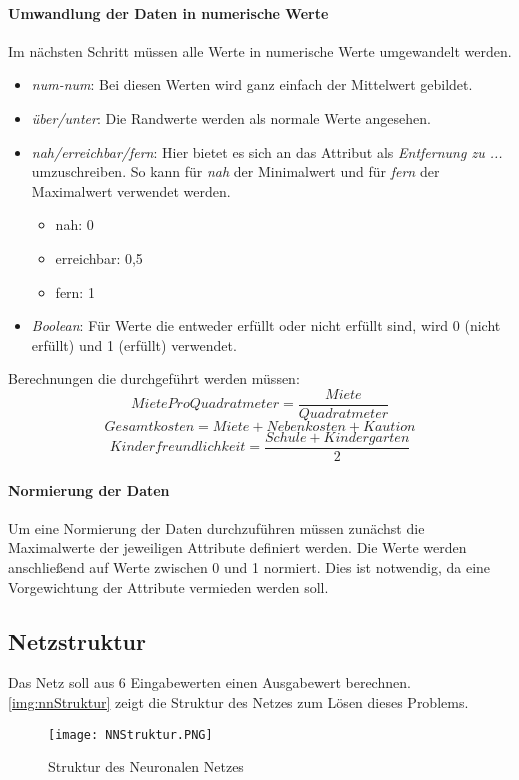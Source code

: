 \paragraph{Umwandlung der Daten in numerische Werte}
Im nächsten Schritt müssen alle Werte in numerische Werte umgewandelt werden. 
\begin{itemize}
    \item \textit{num-num}: Bei diesen Werten wird ganz einfach der Mittelwert gebildet. 
    \item \textit{über/unter}: Die Randwerte werden als normale Werte angesehen. 
    \item \textit{nah/erreichbar/fern}: Hier bietet es sich an das Attribut als \textit{Entfernung zu ...} umzuschreiben. 
                So kann für \textit{nah} der Minimalwert und für \textit{fern} der Maximalwert verwendet werden.
    \begin{itemize}
        \item nah: 0
        \item erreichbar: 0,5
        \item fern: 1
    \end{itemize}
    \item \textit{Boolean}: Für Werte die entweder erfüllt oder nicht erfüllt sind, wird 0 (nicht erfüllt) und 1 (erfüllt) verwendet.
\end{itemize}

Berechnungen die durchgeführt werden müssen: 
\begin{equation}
        MieteProQuadratmeter = \frac{Miete}{Quadratmeter}
\end{equation}
\begin{equation}
    Gesamtkosten = Miete + Nebenkosten + Kaution
\end{equation}
\begin{equation}
    Kinderfreundlichkeit = \frac{Schule + Kindergarten}{2}
\end{equation}

\paragraph{Normierung der Daten}
Um eine Normierung der Daten durchzuführen müssen zunächst die Maximalwerte der 
jeweiligen Attribute definiert werden. Die Werte werden anschließend auf Werte 
zwischen 0 und 1 normiert. Dies ist notwendig, da eine Vorgewichtung der Attribute
vermieden werden soll.

\subsection{Netzstruktur}
Das Netz soll aus $6$ Eingabewerten einen Ausgabewert berechnen. 
\autoref{img:nnStruktur} zeigt die Struktur des Netzes zum Lösen 
dieses Problems. 
\begin{figure}[ht]
    \centering
    \texttt{[image: NNStruktur.PNG]}
    \label{img:nnStruktur}
    \caption{Struktur des Neuronalen Netzes}
\end{figure}

